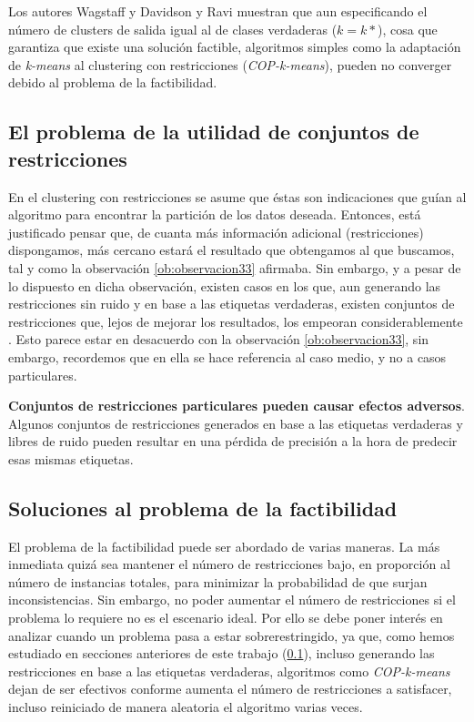 Los autores Wagstaff \cite{Wagstaff:2002} y Davidson y Ravi \cite{DavidsonRavi:2007} muestran que aun especificando el número de clusters de salida igual al de clases verdaderas ($k = k*$), cosa que garantiza que existe una solución factible, algoritmos simples como la adaptación de \textit{k-means} al clustering con restricciones (\textit{COP-k-means}\cite{Wagstaff:2001b}), pueden no converger debido al problema de la factibilidad.

\subsection{El problema de la utilidad de conjuntos de restricciones} \label{ProbRestr}

En el clustering con restricciones se asume que éstas son indicaciones que guían al algoritmo para encontrar la partición de los datos deseada. Entonces, está justificado pensar que, de cuanta más información adicional (restricciones) dispongamos, más cercano estará el resultado que obtengamos al que buscamos, tal y como la observación \ref{ob:observacion33} afirmaba. Sin embargo, y a pesar de lo dispuesto en dicha observación, existen casos en los que, aun generando las restricciones sin ruido y en base a las etiquetas verdaderas, existen conjuntos de restricciones que, lejos de mejorar los resultados, los empeoran considerablemente \cite{DavidsonRaviWagstaff:2006}. Esto parece estar en desacuerdo con la observación \ref{ob:observacion33}, sin embargo, recordemos que en ella se hace referencia al caso medio, y no a casos particulares.

\begin{observacion}
	
	\textbf{Conjuntos de restricciones particulares pueden causar efectos adversos}. Algunos conjuntos de restricciones generados en base a las etiquetas verdaderas y libres de ruido pueden resultar en una pérdida de precisión a la hora de predecir esas mismas etiquetas. \cite{Survey:2007}
	
\end{observacion}

\subsection{Soluciones al problema de la factibilidad}

El problema de la factibilidad puede ser abordado de varias maneras. La más inmediata quizá sea mantener el número de restricciones bajo, en proporción al número de instancias totales, para minimizar la probabilidad de que surjan inconsistencias. Sin embargo, no poder aumentar el número de restricciones si el problema lo requiere no es el escenario ideal. Por ello se debe poner interés en analizar cuando un problema pasa a estar sobrerestringido, ya que, como hemos estudiado en secciones anteriores de este trabajo (\ref{ProbRestr}), incluso generando las restricciones en base a las etiquetas verdaderas, algoritmos como \textit{COP-k-means} dejan de ser efectivos conforme aumenta el número de restricciones a satisfacer, incluso reiniciado de manera aleatoria el algoritmo varias veces.

